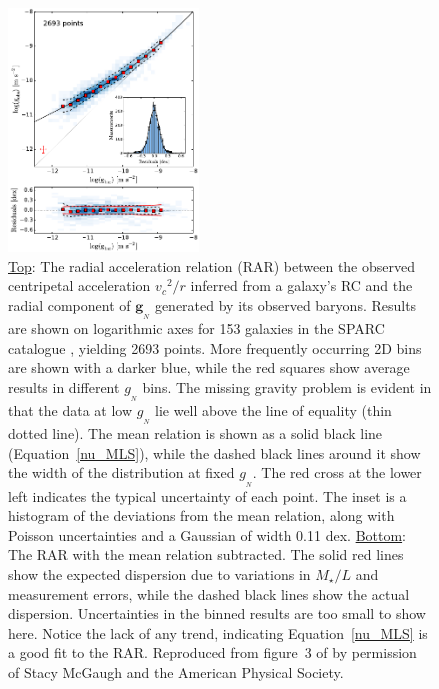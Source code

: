 \documentclass[fleqn,usenatbib,useAMS,onecolumn]{mnras} %
\begin{document}
\begin{figure}
	\centering
	\includegraphics[width=0.45\textwidth]{MLS_16_Figure_3}
	\caption{\underline{Top}: The radial acceleration relation (RAR) between the observed centripetal acceleration ${v_c}^2/r$ inferred from a galaxy's RC and the radial component of $\bm{g}_{_N}$ generated by its observed baryons. Results are shown on logarithmic axes for 153 galaxies in the SPARC catalogue \citep{SPARC}, yielding 2693 points. More frequently occurring 2D bins are shown with a darker blue, while the red squares show average results in different $g_{_N}$ bins. The missing gravity problem is evident in that the data at low $g_{_N}$ lie well above the line of equality (thin dotted line). The mean relation is shown as a solid black line (Equation~\ref{nu_MLS}), while the dashed black lines around it show the width of the distribution at fixed $g_{_N}$. The red cross at the lower left indicates the typical uncertainty of each point. The inset is a histogram of the deviations from the mean relation, along with Poisson uncertainties and a Gaussian of width 0.11 dex. \underline{Bottom}: The RAR with the mean relation subtracted. The solid red lines show the expected dispersion due to variations in $M_{\star}/L$ and measurement errors, while the dashed black lines show the actual dispersion. Uncertainties in the binned results are too small to show here. Notice the lack of any trend, indicating Equation~\ref{nu_MLS} is a good fit to the RAR. Reproduced from figure~3 of \citet{McGaugh_Lelli_2016} by permission of Stacy McGaugh and the American Physical Society.}
	\label{MLS_16_Figure_3}
\end{figure}
\end{document}
